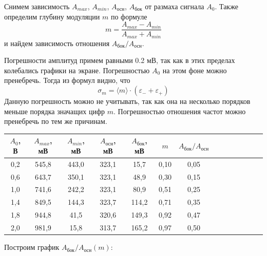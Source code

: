 \documentclass[14pt]{article}
\begin{document}
Снимем зависимость $A_{max}$, $A_{min}$, $A_{\text{осн}}$, $A_{\text{бок}}$ от размаха сигнала $A_0$. Также определим глубину модуляции $m$ по формуле
$$
	m = \frac{A_{max} - A_{min}}{A_{max} + A_{min}}
$$
\noindent и найдем зависимость отношения $A_{\text{бок}}/A_{\text{осн}}$.

Погрешности амплитуд примем равными 0.2 мВ, так как в этих пределах колебались графики на экране. Погрешностью $A_0$ на этом фоне можно пренебречь. Тогда из формул видно, что
$$
	\sigma_m = \langle m\rangle\cdot(\varepsilon_- + \varepsilon_+)
$$
Данную погрешность можно не учитывать, так как она на несколько порядков меньше порядка значащих цифр $m$. Погрешностью отношения частот можно пренебречь по тем же причинам.

\begin{center}
\begin{tabular}{|c|c|c|c|c|c|c|c|c|c|c|c|c|c|}
\hline
$A_0$, В&$A_{max}$, мВ&$A_{min}$, мВ&$A_{\text{осн}}$, мВ&$A_{\text{бок}}$, мВ&$m$&$A_{\text{бок}}/A_{\text{осн}}$\\
\hline
0,2&545,8&443,0&323,1&15,7&0,10&0,05\\
\hline
0,6&643,7&350,1&323,1&48,9&0,30&0,15\\
\hline
1,0&741,6&242,2&323,1&80,9&0,51&0,25\\
\hline
1,4&849,5&144,3&323,7&114,2&0,71&0,35\\
\hline
1,8&944,8&41,5&320,6&149,3&0,92&0,47\\
\hline
2,0&981,9&15,8&313,7&165,2&0,97&0,50\\
\hline
\end{tabular}
\end{center}

\vspace{1cm}
Построим график $A_{\text{бок}}/A_{\text{осн}}(m)$:

\vspace{1cm}
\end{document}
